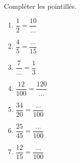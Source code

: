 
\begin{exercice}\label{exosmath-0951}

    Compléter les pointillés.
    \begin{multicols}{2}
        \begin{enumerate}
            \item
                \( \dfrac{ 1 }{ 2 }=\dfrac{ 10 }{ \ldots }\)
            \item
                \( \dfrac{ 4 }{ 5 }=\dfrac{ \ldots }{ 15 }\)
            \item
                \( \dfrac{ 7 }{ \ldots }=\dfrac{ 1 }{ 3 }\)
            \item
                \( \dfrac{ 12 }{ 100 }=\dfrac{ 120 }{ \ldots }\)
            \item
                \( \dfrac{ 34 }{ 20 }=\dfrac{ \ldots }{ 100 }\)
            \item
                \( \dfrac{ 25 }{ 45 }=\dfrac{ \ldots }{ 100 }\)
            \item
                \( \dfrac{ 12 }{ 15 }=\dfrac{ \ldots }{ 100 }\)
        \end{enumerate}
    \end{multicols}

\end{exercice}
